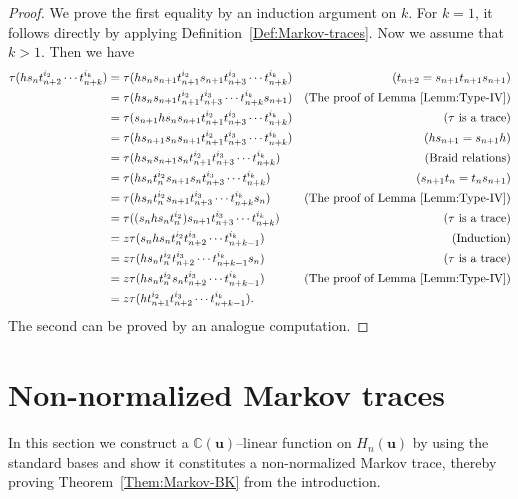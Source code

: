 \documentclass[a4paper, oneside]{amsart}
\numberwithin{equation}{section}
\theoremstyle{definition}
\theoremstyle{remark}
\begin{document}
\begin{proof}We prove the first equality by an induction argument on $k$. For $k=1$, it follows directly by applying Definition~\ref{Def:Markov-traces}. Now we assume that $k>1$. Then we have
   \begin{align*}
     \tau(hs_{n}t_{n+2}^{i_2}\cdots t_{n+k}^{i_k})&=\tau(hs_{n}s_{n+1}t_{n+1}^{i_2}s_{n+1}t_{n+3}^{i_3}\cdots t_{n+k}^{i_k})&\mathrm{(}t_{n+2}=s_{n+1}t_{n+1}s_{n+1}\mathrm{)}\\
     &=\tau(hs_{n}s_{n+1}t_{n+1}^{i_2}t_{n+3}^{i_3}\cdots t_{n+k}^{i_k}s_{n+1})
     &(\text{The proof of Lemma}~\ref{Lemm:Type-IV})\\
     &=\tau(s_{n+1}hs_{n}s_{n+1}t_{n+1}^{i_2}t_{n+3}^{i_3}\cdots t_{n+k}^{i_k})&(\tau \text{ is a trace})\\
     &=\tau(hs_{n+1}s_{n}s_{n+1}t_{n+1}^{i_2}t_{n+3}^{i_3}\cdots t_{n+k}^{i_k})&(hs_{n+1}=s_{n+1}h)\\
     &=\tau(hs_ns_{n+1}s_{n}t_{n+1}^{i_2}t_{n+3}^{i_3}\cdots t_{n+k}^{i_k})&(\text{Braid relations})\\
     &=\tau(hs_nt_{n}^{i_2}s_{n+1}s_nt_{n+3}^{i_3}\cdots t_{n+k}^{i_k})&(s_{n+1}t_n=t_ns_{n+1})\\
     &=\tau(hs_nt_{n}^{i_2}s_{n+1}t_{n+3}^{i_3}\cdots t_{n+k}^{i_k}s_n)&(\text{The proof of Lemma}~\ref{Lemm:Type-IV})\\
     &=\tau((s_nhs_nt_{n}^{i_2})s_{n+1}t_{n+3}^{i_3}\cdots t_{n+k}^{i_k})&(\tau \text{ is a trace})\\
     &=z\tau(s_nhs_nt_{n}^{i_2}t_{n+2}^{i_3}\cdots t_{n+k-1}^{i_k})&(\text{Induction})\\
     &=z\tau(hs_nt_{n}^{i_2}t_{n+2}^{i_3}\cdots t_{n+k-1}^{i_k}s_n)&(\tau \text{ is a trace})\\
     &=z\tau(hs_nt_{n}^{i_2}s_nt_{n+2}^{i_3}\cdots t_{n+k-1}^{i_k})&(\text{The proof of Lemma}~\ref{Lemm:Type-IV})\\
     &=z\tau(ht_{n+1}^{i_2}t_{n+2}^{i_3}\cdots t_{n+k-1}^{i_k}).
   \end{align*}
   The second can be proved by an analogue computation.
\end{proof}






\section{Non-normalized Markov traces}\label{Sec:BK-trace}
In this section we  construct a $\mathbb{C}(\boldsymbol{u})$--linear function on $H_n(\boldsymbol{u})$ by using the standard bases and show it constitutes a non-normalized Markov trace, thereby proving Theorem~\ref{Them:Markov-BK} from the introduction.
\end{document}
